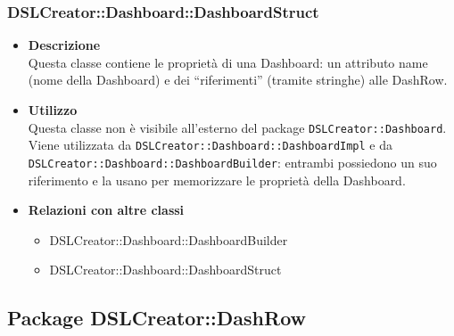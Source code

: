                 \subsubsection{DSLCreator::Dashboard::DashboardStruct}
                    \begin{itemize}
                        \item \textbf{Descrizione} \hfill \\
                            Questa classe contiene le proprietà di una Dashboard: un attributo name (nome della Dashboard) e dei ``riferimenti'' (tramite stringhe) alle DashRow.
                        \item \textbf{Utilizzo} \hfill \\
                            Questa classe non è visibile all'esterno del package \texttt{DSLCreator::Dashboard}. Viene utilizzata da \texttt{DSLCreator::Dashboard::DashboardImpl} e da \texttt{DSLCreator::Dash\-board::DashboardBuilder}: entrambi possiedono un suo riferimento e la usano per memorizzare le proprietà della Dashboard.
                        \item \textbf{Relazioni con altre classi}
                            \begin{itemize}
                              \item DSLCreator::Dashboard::DashboardBuilder
                              \item DSLCreator::Dashboard::DashboardStruct
                            \end{itemize}
                    \end{itemize}


        \subsection{Package DSLCreator::DashRow}
